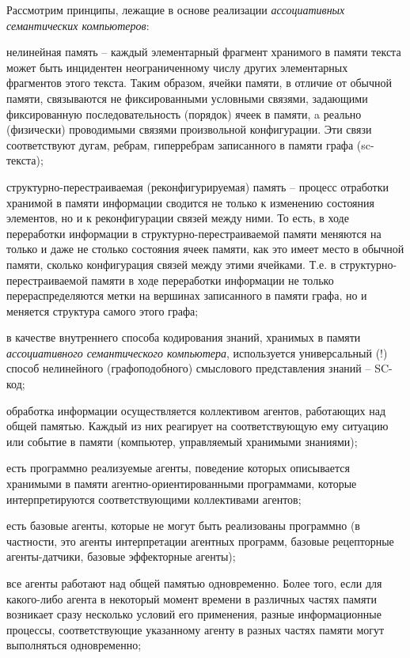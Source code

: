Рассмотрим принципы, лежащие в основе реализации \textit{ассоциативных семантических компьютеров}:
\begin{textitemize}
	\item нелинейная память -- каждый элементарный фрагмент хранимого в памяти текста может быть инцидентен неограниченному числу других элементарных фрагментов этого текста. Таким образом, ячейки памяти, в отличие от обычной памяти, связываются не фиксированными условными связями, задающими фиксированную последовательность (порядок) ячеек в памяти, a реально (физически) проводимыми связями произвольной конфигурации. Эти связи соответствуют дугам, ребрам, гиперребрам записанного в памяти графа (sc-текста);
	\item структурно-перестраиваемая (реконфигурируемая) память -- процесс отработки хранимой в памяти информации сводится не только к изменению состояния элементов, но и к реконфигурации связей между ними. То есть, в ходе переработки информации в структурно-перестраиваемой памяти меняются на только и даже не столько состояния ячеек памяти, как это имеет место в обычной памяти, сколько конфигурация связей между этими ячейками. Т.е. в структурно-перестраиваемой памяти в ходе переработки информации не только перераспределяются метки на вершинах записанного в памяти графа, но и меняется структура самого этого графа;	
	\item в качестве внутреннего способа кодирования знаний, хранимых в памяти \textit{ассоциативного семантического компьютера}, используется универсальный (!) способ нелинейного (графоподобного) смыслового представления знаний -- SC-код;
	\item обработка информации осуществляется коллективом агентов, работающих над общей памятью. Каждый из них реагирует на соответствующую ему ситуацию или событие в памяти (компьютер, управляемый хранимыми знаниями);
	\item есть программно реализуемые агенты, поведение которых описывается хранимыми в памяти агентно-ориентированными программами, которые интерпретируются соответствующими коллективами агентов;
	\item есть базовые агенты, которые не могут быть реализованы программно (в частности, это агенты интерпретации агентных программ, базовые рецепторные агенты-датчики, базовые эффекторные агенты);
	\item все агенты работают над общей памятью одновременно. Более того, если для какого-либо агента в некоторый момент времени в различных частях памяти возникает сразу несколько условий его применения, разные информационные процессы, соответствующие указанному агенту в разных частях памяти могут выполняться одновременно;

\end{textitemize}

